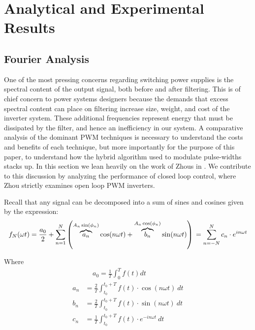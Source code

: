 
\chapter{Analytical and Experimental Results} %

\label{Chapter5} %


\section{Fourier Analysis}
\label{Fourier}
One of the most pressing concerns regarding switching power supplies is the spectral content of the output signal, both before and after filtering. This is of chief concern to power systems designers because the demands that excess spectral content can place on filtering increase size, weight, and cost of the inverter system. These additional frequencies represent energy that must be dissipated by the filter, and hence an inefficiency in our system. A comparative analysis of the dominant PWM techniques is necessary to understand the costs and benefits of each technique, but more importantly for the purpose of this paper, to understand how the hybrid algorithm used to modulate pulse-widths stacks up. In this section we lean heavily on the work of Zhous in \cite{FourierAnalysis}. We contribute to this discussion by analyzing the performance of closed loop control, where Zhou strictly examines open loop PWM inverters.

Recall that any signal can be decomposed into a sum of sines and cosines given by the expression:
\begin{equation}
f_N(\omega t) = \frac{a_0}{2} + \sum_{n=1}^N \left(\overbrace{a_n}^{A_n \sin(\phi_n)} \cos(n\omega t) + \overbrace{b_n}^{A_n \cos(\phi_n)} \sin(n\omega t)\right)\\
= \sum_{n=-N}^N c_n\cdot e^{in\omega t}
\end{equation}

Where
\begin{align*}
& ~~~~~ a_0 = \frac{1}{T}\int_{0}^{T}f(t)dt \\
a_n &= \frac{2}{T}\int_{t_0}^{t_0+T} f(t)\cdot  \cos(n\omega t)\ dt \\
b_n &= \frac{2}{T}\int_{t_0}^{t_0+T} f(t)\cdot  \sin(n\omega t)\ dt \\
c_n &= \frac{1}{T}\int_{t_0}^{t_0+T} f(t)\cdot e^{-in\omega t}\ dt
\end{align*}

